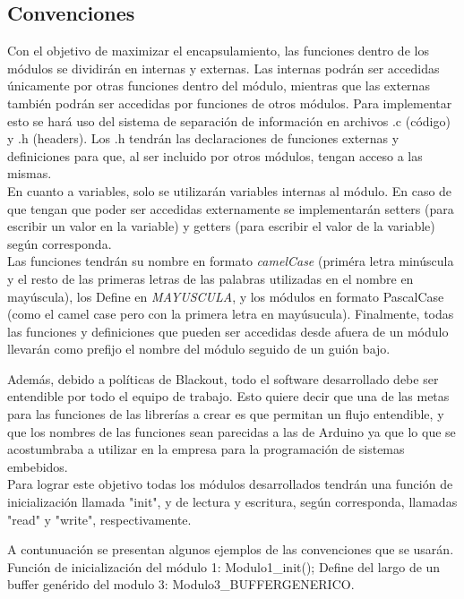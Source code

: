 \subsection{Convenciones}
Con el objetivo de maximizar el encapsulamiento, las funciones dentro de los módulos se dividirán en internas y externas. Las internas podrán ser accedidas únicamente por otras funciones dentro del módulo, mientras que las externas también podrán ser accedidas por funciones de otros módulos. Para implementar esto se hará uso del sistema de separación de información en archivos .c (código) y .h (headers). Los .h tendrán las declaraciones de funciones externas y definiciones para que, al ser incluido por otros módulos, tengan acceso a las mismas.\\
En cuanto a variables, solo se utilizarán variables internas al módulo. En caso de que tengan que poder ser accedidas externamente se implementarán setters (para escribir un valor en la variable) y getters (para escribir el valor de la variable) según corresponda.\\
Las funciones tendrán su nombre en formato \textit{camelCase} (priméra letra minúscula y el resto de las primeras letras de las palabras utilizadas en el nombre en mayúscula), los Define en \textit{MAYUSCULA}, y los módulos en formato PascalCase (como el camel case pero con la primera letra en mayúsucula).
Finalmente, todas las funciones y definiciones que pueden ser accedidas desde afuera de un módulo llevarán como prefijo el nombre del módulo seguido de un guión bajo. 

Además, debido a políticas de Blackout, todo el software desarrollado debe ser entendible por todo el equipo de trabajo. Esto quiere decir que una de las metas para las funciones de las librerías a crear es que permitan un flujo entendible, y que los nombres de las funciones sean parecidas a las de Arduino ya que lo que se acostumbraba a utilizar en la empresa para la programación de sistemas embebidos.\\
Para lograr este objetivo todas los módulos desarrollados tendrán una función de inicialización llamada "init", y de lectura y escritura, según corresponda, llamadas "read" y "write", respectivamente. 

A contunuación se presentan algunos ejemplos de las convenciones que se usarán. Función de inicialización del módulo 1: Modulo1\_init(); Define del largo de un buffer genérido del modulo 3: Modulo3\_BUFFERGENERICO.



